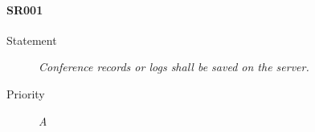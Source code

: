 \paragraph{SR001}
  \begin{description}
  \item [Statement] 
    \textit{ Conference records or logs shall be saved on the server.}
  \item [Priority] \textit{A}
\end{description}
